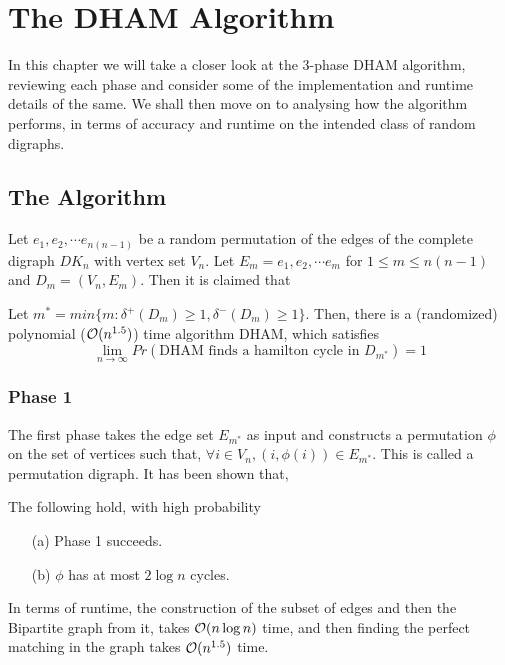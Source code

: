 
\chapter{The DHAM Algorithm}
\label{ch:dham}
\vspace{2em}

In this chapter we will take a closer look at the 3-phase DHAM algorithm\cite{frieze:dham}, reviewing each phase and consider some of the implementation and runtime details of the same. We shall then move on to analysing how the algorithm performs, in terms of accuracy and runtime on the intended class of random digraphs.

\section{The Algorithm}
Let $e_1, e_2, \cdots e_{n(n-1)}$ be a random permutation of the edges of the complete digraph $DK_n$ with vertex set $V_n$. Let $E_m = e_1, e_2, \cdots e_m$ for $1 \le m \le n(n-1)$ and $D_m = (V_n, E_m)$. Then it is claimed that 
\begin{theorem}
Let $m^* = min\{ m: \delta^+(D_m) \ge 1, \delta^-(D_m) \ge 1\}$. Then, there is a (randomized) polynomial ($\mathcal{O}(n^{1.5})$) time algorithm DHAM, which satisfies
\[ \lim_{n \rightarrow \infty} Pr( \text{DHAM finds a hamilton cycle in } D_{m^*} ) = 1 \]
\label{thm:dham}
\end{theorem}

\subsection{Phase 1}
The first phase takes the edge set $E_{m^*}$ as input and constructs a permutation $\phi$ on the set of vertices such that, $\forall i\in V_n, (i, \phi(i)) \in E_{m^*}$.  This is called a permutation digraph. It has been shown that,

\begin{lemma}
The following hold, with high probability
\begin{enumerate}
\item[(a) ] Phase 1 succeeds.
\item[(b) ] $\phi$ has at most $2 \log n$ cycles.
\end{enumerate}
\end{lemma}

In terms of runtime, the construction of the subset of edges and then the Bipartite graph from it, takes $\mathcal{O}(n\log n)$ time, and then finding the perfect matching in the graph takes $\mathcal{O}(n^{1.5})$ time\cite{dinic:flow}.

